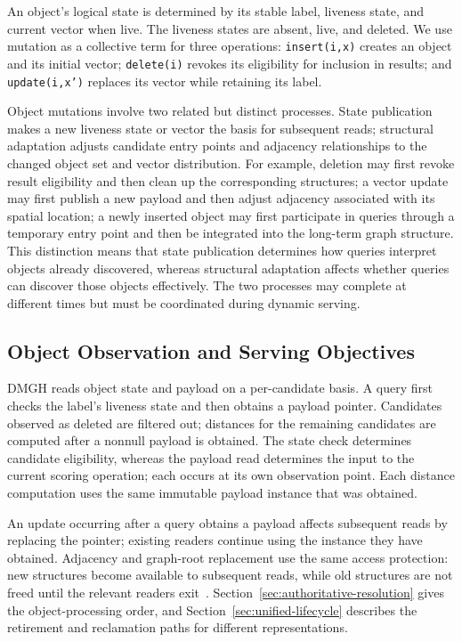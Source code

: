 \documentclass[sigconf,pbalance]{acmart}
\begin{document}
An object's logical state is determined by its stable label, liveness state, and current vector when live. The liveness states are absent, live, and deleted. We use mutation as a collective term for three operations: \texttt{insert(i,x)} creates an object and its initial vector; \texttt{delete(i)} revokes its eligibility for inclusion in results; and \texttt{update(i,x')} replaces its vector while retaining its label.

Object mutations involve two related but distinct processes. State publication makes a new liveness state or vector the basis for subsequent reads; structural adaptation adjusts candidate entry points and adjacency relationships to the changed object set and vector distribution. For example, deletion may first revoke result eligibility and then clean up the corresponding structures; a vector update may first publish a new payload and then adjust adjacency associated with its spatial location; a newly inserted object may first participate in queries through a temporary entry point and then be integrated into the long-term graph structure. This distinction means that state publication determines how queries interpret objects already discovered, whereas structural adaptation affects whether queries can discover those objects effectively. The two processes may complete at different times but must be coordinated during dynamic serving.

\subsection{Object Observation and Serving Objectives}
\label{sec:consistency-state}

DMGH reads object state and payload on a per-candidate basis. A query first checks the label's liveness state and then obtains a payload pointer. Candidates observed as deleted are filtered out; distances for the remaining candidates are computed after a nonnull payload is obtained. The state check determines candidate eligibility, whereas the payload read determines the input to the current scoring operation; each occurs at its own observation point. Each distance computation uses the same immutable payload instance that was obtained.

An update occurring after a query obtains a payload affects subsequent reads by replacing the pointer; existing readers continue using the instance they have obtained. Adjacency and graph-root replacement use the same access protection: new structures become available to subsequent reads, while old structures are not freed until the relevant readers exit~\cite{brown2015debra}. Section~\ref{sec:authoritative-resolution} gives the object-processing order, and Section~\ref{sec:unified-lifecycle} describes the retirement and reclamation paths for different representations.
\end{document}

